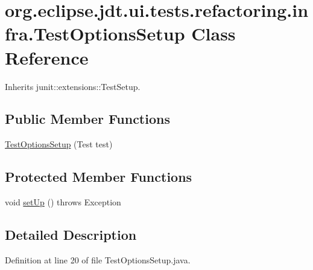 \hypertarget{classorg_1_1eclipse_1_1jdt_1_1ui_1_1tests_1_1refactoring_1_1infra_1_1TestOptionsSetup}{
\section{org.eclipse.jdt.ui.tests.refactoring.infra.TestOptionsSetup Class Reference}
\label{classorg_1_1eclipse_1_1jdt_1_1ui_1_1tests_1_1refactoring_1_1infra_1_1TestOptionsSetup}
}


Inherits junit::extensions::TestSetup.

\subsection*{Public Member Functions}
\begin{DoxyCompactItemize}
\item 
\hyperlink{classorg_1_1eclipse_1_1jdt_1_1ui_1_1tests_1_1refactoring_1_1infra_1_1TestOptionsSetup_af98559b9dc59b7385b4581c88b05583a}{TestOptionsSetup} (Test test)
\end{DoxyCompactItemize}
\subsection*{Protected Member Functions}
\begin{DoxyCompactItemize}
\item 
void \hyperlink{classorg_1_1eclipse_1_1jdt_1_1ui_1_1tests_1_1refactoring_1_1infra_1_1TestOptionsSetup_aeee4c82bbb1113d75c4aa95f5e6f1c97}{setUp} ()  throws Exception 
\end{DoxyCompactItemize}


\subsection{Detailed Description}


Definition at line 20 of file TestOptionsSetup.java.



